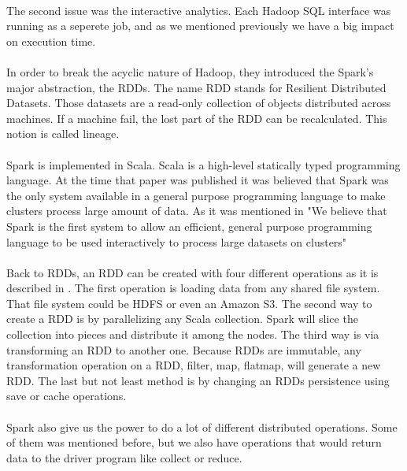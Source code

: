 \paragraph{}The second issue was the interactive analytics. Each Hadoop SQL interface was running as a seperete job, and as we mentioned previously we have a big impact on execution time.

\paragraph{}In order to break the acyclic nature of Hadoop, they introduced the Spark's major abstraction, the RDDs. The name RDD stands for Resilient Distributed Datasets. Those datasets are a read-only collection of objects distributed across machines. If a machine fail, the lost part of the RDD can be recalculated. This notion is called lineage.

\paragraph{}Spark is implemented in Scala. Scala is a high-level statically typed programming language. At the time that paper was published it was believed that Spark was the only system available in a general purpose programming language to make clusters process large amount of data. As it was mentioned in \cite{Zaharia:2010:SCC:1863103.1863113} "We believe that Spark is the first system to allow an efficient, general purpose programming language to be used interactively to process large datasets on clusters"

\paragraph{}Back to RDDs, an RDD can be created with four different operations as it is described in \cite{Zaharia:2010:SCC:1863103.1863113}. The first operation is loading data from any shared file system. That file system could be HDFS or even an Amazon S3. The second way to create a RDD is by parallelizing any Scala collection. Spark will slice the collection into pieces and distribute it among the nodes. The third way is via transforming an RDD to another one. Because RDDs are immutable, any transformation operation on a RDD, filter, map, flatmap, will generate a new RDD. The last but not least method is by changing an RDDs persistence using save or cache operations.

\paragraph{}Spark also give us the power to do a lot of different distributed operations. Some of them was mentioned before, but we also have operations that would return data to the driver program like collect or reduce. 

